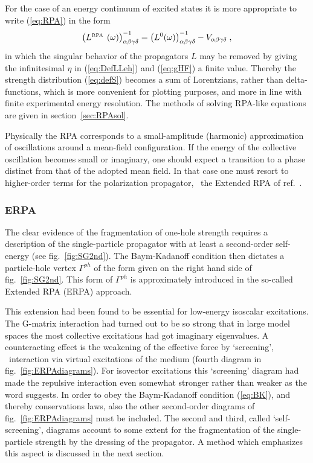 For the case of an energy continuum of excited states it is more appropriate 
to write (\ref{eq:RPA}) in the form
%
	\begin{equation}
		\left( 
		L^{\mbox{\tiny RPA}\phantom{0}}(\omega)
		\right)^{-1}_{\alpha\beta\gamma\delta}
	=
		\left( 
		L^{0}(\omega)
		\right)^{-1}_{\alpha\beta\gamma\delta}
	-
		V_{\alpha\beta\gamma\delta}
	\label{eq:RPAinv}
	\;,
	\end{equation}
%
in which the singular behavior of the propagators $L$ may be removed by 
giving the infinitesimal $\eta$ in (\ref{eq:DefLLeh}) and (\ref{eq:gHF})
a finite value. Thereby the strength distribution (\ref{eq:defS}) becomes a sum
of Lorentzians, rather than delta-functions, which is more convenient for
plotting purposes, and more in line with finite experimental energy resolution.
The methods of solving RPA-like equations are given in section~\ref{sec:RPAsol}.

Physically the RPA corresponds to a small-amplitude (harmonic) approximation 
of oscillations around a mean-field configuration. If the energy of the 
collective oscillation becomes small or imaginary, one should expect 
a transition to a phase distinct from that of the adopted mean field. 
In that case one must resort to higher-order terms for the polarization 
propagator, 
\eg\ the Extended RPA of ref.~\cite{BAD90}.

\subsubsection{ERPA}
The clear evidence of the fragmentation of one-hole strength requires a 
description of the single-particle propagator with at least a second-order 
self-energy (see fig.~\ref{fig:SG2nd}). The Baym-Kadanoff condition then 
dictates a particle-hole vertex $\Gamma^{ph}$ of the form given on the right
hand side of fig.~\ref{fig:SG2nd}. This form of $\Gamma^{ph}$ is approximately
introduced in the so-called Extended RPA (ERPA) approach\cite{BAD90}. 

This extension had been found to be essential for low-energy isoscalar 
excitations. 
The G-matrix interaction had turned out to be so strong that in large model 
spaces 
the most collective excitations had got imaginary eigenvalues. A counteracting 
effect is the weakening of the effective force by `screening', \ie\ interaction
via virtual excitations of the medium (fourth diagram in 
fig.~\ref{fig:ERPAdiagrams}). For isovector excitations this `screening' 
diagram had made the repulsive interaction even somewhat stronger rather than 
weaker as the word suggests\cite{BAD90}. In order to obey the Baym-Kadanoff 
condition (\ref{eq:BK}), and thereby conservations laws, also the other 
second-order diagrams of fig.~\ref{fig:ERPAdiagrams} must be included.
The second and third, called `self-screening', diagrams account to some extent 
for the fragmentation of the single-particle strength by the dressing of the 
propagator. A method which emphasizes this aspect is discussed in the next 
section.

